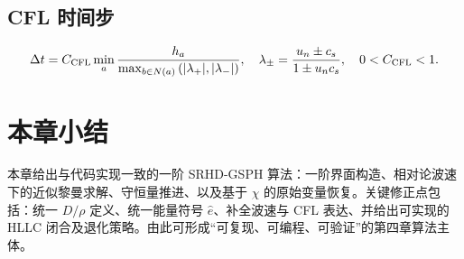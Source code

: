\subsection{CFL 时间步}
\begin{equation}
\Delta t=C_{\rm CFL}\min_a\frac{h_a}{\max_{b\in N(a)}\left(|\lambda_+|,|\lambda_-|\right)},
\quad \lambda_{\pm}=\frac{u_n\pm c_s}{1\pm u_nc_s},\quad 0<C_{\rm CFL}<1.
\end{equation}

\section{本章小结}

本章给出与代码实现一致的一阶 SRHD-GSPH 算法：一阶界面构造、相对论波速下的近似黎曼求解、守恒量推进、以及基于 $\chi$ 的原始变量恢复。关键修正点包括：统一 $D/\rho$ 定义、统一能量符号 $\hat{e}$、补全波速与 CFL 表达、并给出可实现的 HLLC 闭合及退化策略。由此可形成“可复现、可编程、可验证”的第四章算法主体。

